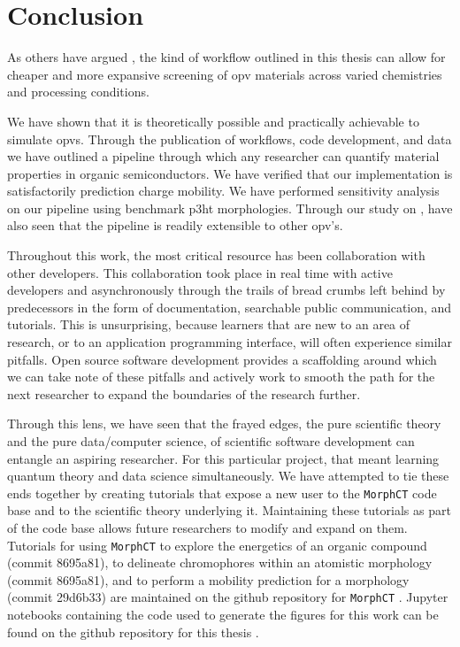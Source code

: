 \chapter{Conclusion}
\label{conclusion}

As others have argued \cite{Evans2016}\cite{Gali2017}\cite{Jones2017}, the kind of workflow outlined in this thesis
can allow for cheaper and more expansive screening of \gls{opv} materials across varied chemistries and processing
conditions. 

We have shown that it is theoretically possible and practically
achievable to simulate \gls{opv}s. 
Through the publication
of workflows, code development, and data we have outlined a 
pipeline through which any researcher can quantify material properties in
organic semiconductors. We have verified that our implementation is satisfactorily prediction charge mobility. We have performed sensitivity analysis on our pipeline using benchmark
\gls{p3ht} morphologies. Through our study on ,  have also seen that the pipeline is readily
extensible to other \gls{opv}'s.

Throughout this work, the most critical resource has been collaboration with
other developers. This collaboration took place in real time with active
developers and asynchronously through the trails of bread crumbs left behind
by predecessors in the form of documentation, searchable public communication,
and tutorials. This is unsurprising, because learners that are new to an area
of research, or to an application programming interface, will often experience
similar pitfalls. Open source software development provides a scaffolding
around which we can take note of these pitfalls and actively work to smooth the 
path for the next
researcher to expand the boundaries of the research further.

Through this lens, we have seen that the frayed edges, the pure
scientific theory and the pure data/computer science, of scientific software
development can entangle an aspiring researcher. For this particular project,
that meant learning quantum theory and data science simultaneously. We have
attempted to tie these ends together by creating tutorials that expose a new
user to the \texttt{MorphCT} code base and to the scientific theory
underlying it. Maintaining these tutorials as part of the code base allows
future researchers to modify and expand on them. Tutorials for using \texttt{MorphCT} to explore the
energetics of an organic compound (commit 8695a81), to delineate chromophores within an atomistic morphology
(commit 8695a81), and to perform a
mobility prediction for a morphology (commit 29d6b33) are maintained on the github repository for \texttt{MorphCT} \cite{examples}. 
Jupyter notebooks containing the code used to generate the figures for this work can be found on the
github repository for this thesis \cite{thesis}.

